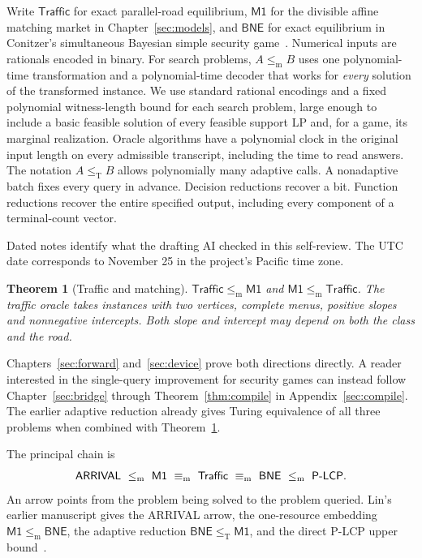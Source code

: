 \documentclass[11pt,oneside,openany,notitlepage]{report}
\newtheorem{theorem}{Theorem}[chapter]
\newcommand{\Market}{\mathsf{M1}}
\newcommand{\Traffic}{\mathsf{Traffic}}
\newcommand{\BNE}{\mathsf{BNE}}
\newcommand{\Arrival}{\mathsf{ARRIVAL}}
\newcommand{\PLCP}{\mathsf{P\mbox{-}LCP}}
\newcommand{\dd}{\mathrel{\leq_{\mathrm m}}}
\newcommand{\ttred}{\mathrel{\leq_{\mathrm T}}}
\begin{document}
Write \(\Traffic\) for exact parallel-road equilibrium, \(\Market\) for the
divisible affine matching market in Chapter~\ref{sec:models}, and
\(\BNE\) for exact equilibrium in Conitzer's simultaneous Bayesian simple
security game~\cite{conitzer}. Numerical inputs are rationals encoded in binary.
For search problems, \(A\dd B\) uses one polynomial-time transformation
and a polynomial-time decoder that works for \emph{every} solution of the
transformed instance. We use standard rational encodings and a fixed
polynomial witness-length bound for each search problem, large enough
to include a basic feasible solution of every feasible support LP and,
for a game, its marginal realization. Oracle algorithms have a
polynomial clock in the original input length on every admissible
transcript, including the time to read answers. The notation
\(A\ttred B\) allows polynomially many adaptive calls. A nonadaptive
batch fixes every query in advance.
Decision reductions recover a bit. Function reductions recover the entire
specified output, including every component of a terminal-count vector.

Dated notes identify what the drafting AI checked in this self-review.
The UTC date corresponds to November 25 in the project's Pacific time zone.

\begin{theorem}[Traffic and matching]\label{thm:traffic}
\(\Traffic\dd\Market\) and \(\Market\dd\Traffic\).
The traffic oracle takes instances with two vertices, complete menus,
positive slopes and nonnegative intercepts. Both slope and intercept may depend on both the
class and the road.
\end{theorem}

Chapters~\ref{sec:forward} and~\ref{sec:device} prove both directions
directly. A reader interested in the single-query improvement for security
games can instead follow Chapter~\ref{sec:bridge} through
Theorem~\ref{thm:compile} in Appendix~\ref{sec:compile}. The earlier
adaptive reduction already gives Turing equivalence of all three problems
when combined with Theorem~\ref{thm:traffic}.

The principal chain is
\[
 \Arrival\ \dd\ \Market
 \ \mathrel{\equiv_{\rm m}}\ \Traffic
 \ \mathrel{\equiv_{\rm m}}\ \BNE
 \ \dd\ \PLCP .
\]
An arrow points from the problem being solved to the problem queried.
Lin's earlier manuscript gives the ARRIVAL arrow, the one-resource
embedding \(\Market\dd\BNE\), the adaptive reduction \(\BNE\ttred\Market\),
and the direct P-LCP upper bound~\cite[Chapters~3--5]{book}.
\end{document}
